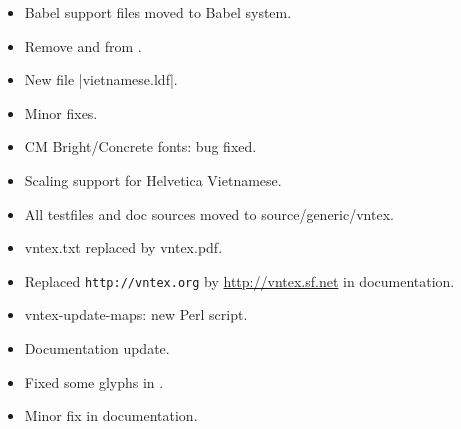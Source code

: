 \begin{releasenotes}

\begin{itemize}
\item Babel support files moved to Babel system.
\end{itemize}

\begin{itemize}
\item Remove  and  from .
\item New file |vietnamese.ldf|.
\end{itemize}

\begin{itemize}
\item Minor fixes.
\end{itemize}

\begin{itemize}
\item CM Bright/Concrete fonts: bug fixed.
\item Scaling support for Helvetica Vietnamese.
\item All testfiles and doc sources moved to source/generic/vntex.
\item vntex.txt replaced by vntex.pdf.
\end{itemize}

\begin{itemize}
\item Replaced \texttt{http://vntex.org} by \url{http://vntex.sf.net}
  in documentation.
\end{itemize}

\begin{itemize}
\item vntex-update-maps: new Perl script.
\item Documentation update.
\end{itemize}

\begin{itemize}
\item Fixed some glyphs in .
\end{itemize}

\begin{itemize}
  \item Minor fix in documentation.
\end{itemize}


\end{releasenotes}
